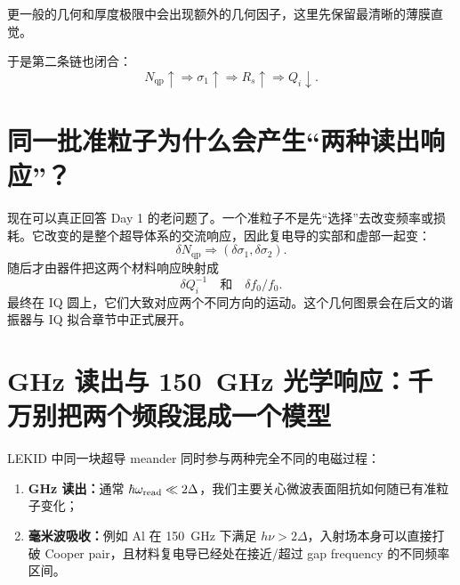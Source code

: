 \documentclass[11pt,a4paper,openany]{ctexrep}
\newcommand{\qp}{\mathrm{qp}}
\begin{document}
更一般的几何和厚度极限中会出现额外的几何因子，这里先保留最清晰的薄膜直觉。

于是第二条链也闭合：
\[
N_{\qp}\uparrow
\Rightarrow
\sigma_1\uparrow
\Rightarrow
R_s\uparrow
\Rightarrow
Q_i\downarrow.
\]

\begin{center}
\end{center}

\section{同一批准粒子为什么会产生“两种读出响应”？}

现在可以真正回答 Day 1 的老问题了。一个准粒子不是先“选择”去改变频率或损耗。它改变的是整个超导体系的交流响应，因此复电导的实部和虚部一起变：
\[
\delta N_{\qp}
\Rightarrow
\left(\delta\sigma_1,\delta\sigma_2\right).
\]
随后才由器件把这两个材料响应映射成
\[
\boxed{
\delta Q_i^{-1}
\quad\text{和}\quad
\delta f_0/f_0.
}
\]
最终在 IQ 圆上，它们大致对应两个不同方向的运动。这个几何图景会在后文的谐振器与 IQ 拟合章节中正式展开。

\section{GHz 读出与 \SI{150}{GHz} 光学响应：千万别把两个频段混成一个模型}

LEKID 中同一块超导 meander 同时参与两种完全不同的电磁过程：
\begin{enumerate}
  \item \textbf{GHz 读出：}通常 $\hbar\omega_{\rm read}\ll2\Delta$，我们主要关心微波表面阻抗如何随已有准粒子变化；
  \item \textbf{毫米波吸收：}例如 Al 在 \SI{150}{GHz} 下满足 $h\nu>2\Delta$，入射场本身可以直接打破 Cooper pair，且材料复电导已经处在接近/超过 gap frequency 的不同频率区间。
\end{enumerate}
\end{document}
